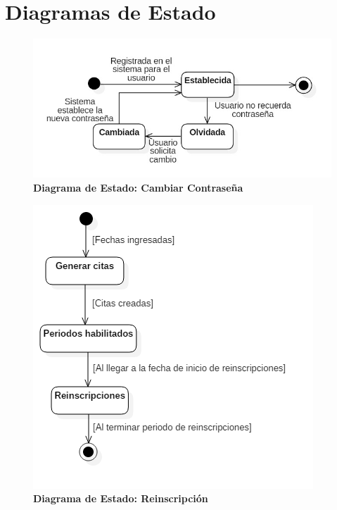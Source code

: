 \chapter{Diagramas de Estado}
\begin{figure}[H]
  \centering
    \includegraphics[scale=0.55,angle=0]{project/Estado/E_cambiar_contrasena.jpg}
  \caption{\textbf{Diagrama de Estado: Cambiar Contraseña}}
\end{figure}
\begin{figure}[H]
  \centering
    \includegraphics[scale=0.7,angle=0]{project/Estado/habilitar_reinscripciones.png}
  \caption{\textbf{Diagrama de Estado: Reinscripción}}
\end{figure}
